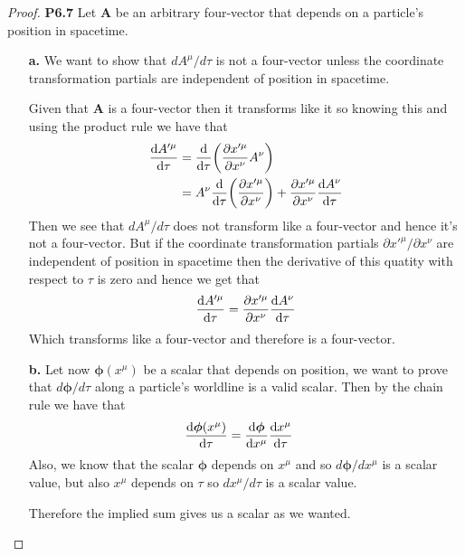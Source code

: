 \documentclass[11pt]{article}
\theoremstyle{definition}
\begin{document}
\begin{proof}{\textbf{P6.7}}
    Let $\bm{A}$ be an arbitrary four-vector that depends on a particle's 
    position in spacetime.
    \begin{itemize}
        \item [\textbf{a.}] We want to show that $dA^\mu/d\tau$ is not a
        four-vector unless the coordinate transformation partials
        are independent of position in spacetime.

        Given that $\bm{A}$ is a four-vector then it transforms like it so
        knowing this and using the product rule we have that
        \begin{align*}
            \derivative{A'^\mu}{\tau} &= \derivative{}{\tau}
            \bigg(\partialderivative{x'^\mu}{x^\nu}A^\nu \bigg)\\
            &= A^\nu\derivative{}{\tau}
            \bigg(\partialderivative{x'^\mu}{x^\nu}\bigg)
            + \partialderivative{x'^\mu}{x^\nu}\derivative{A^\nu}{\tau}
        \end{align*}
        Then we see that $dA^\mu/d\tau$ does not transform like a four-vector
        and hence it's not a four-vector.
        But if the coordinate transformation partials
        $\partial x'^\mu/\partial x^\nu$ are independent of position in
        spacetime then the derivative of this quatity with respect to $\tau$
        is zero and hence we get that
        \begin{align*}
            \derivative{A'^\mu}{\tau} 
            = \partialderivative{x'^\mu}{x^\nu}\derivative{A^\nu}{\tau}
        \end{align*}
        Which transforms like a four-vector and therefore is a four-vector.

        \item [\textbf{b.}] Let now $\bm{\phi}(x^\mu)$ be a scalar that depends
        on position, we want to prove that $d\bm{\phi}/d\tau$ along a particle's
        worldline is a valid scalar. Then by the chain rule we have that
        \begin{align*}
            \derivative{\bm{\phi}(x^\mu)}{\tau}
            &= \derivative{\bm{\phi}}{x^\mu}\derivative{x^\mu}{\tau}
        \end{align*}
        Also, we know that the scalar $\bm\phi$ depends on $x^\mu$ and so
        $d\bm{\phi}/dx^\mu$ is a scalar value, but also $x^\mu$ depends
        on $\tau$ so $dx^\mu/d\tau$ is a scalar value.
        
        Therefore the implied sum gives us a scalar as we wanted.
    \end{itemize}
\end{proof}

    
\end{document}
